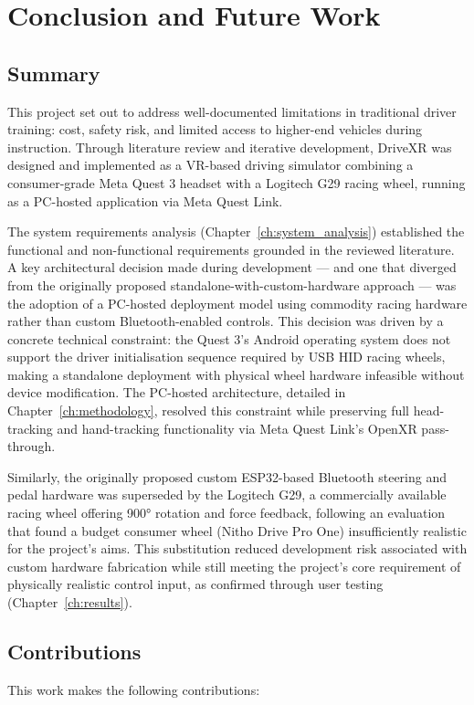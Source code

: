 \chapter{Conclusion and Future Work}
\label{ch:conclusion}

\section{Summary}
This project set out to address well-documented limitations in traditional driver training: cost, safety risk, and limited access to higher-end vehicles during instruction. Through literature review and iterative development, DriveXR was designed and implemented as a VR-based driving simulator combining a consumer-grade Meta Quest 3 headset with a Logitech G29 racing wheel, running as a PC-hosted application via Meta Quest Link.

The system requirements analysis (Chapter~\ref{ch:system_analysis}) established the functional and non-functional requirements grounded in the reviewed literature. A key architectural decision made during development — and one that diverged from the originally proposed standalone-with-custom-hardware approach — was the adoption of a PC-hosted deployment model using commodity racing hardware rather than custom Bluetooth-enabled controls. This decision was driven by a concrete technical constraint: the Quest 3's Android operating system does not support the driver initialisation sequence required by USB HID racing wheels, making a standalone deployment with physical wheel hardware infeasible without device modification. The PC-hosted architecture, detailed in Chapter~\ref{ch:methodology}, resolved this constraint while preserving full head-tracking and hand-tracking functionality via Meta Quest Link's OpenXR pass-through.

Similarly, the originally proposed custom ESP32-based Bluetooth steering and pedal hardware was superseded by the Logitech G29, a commercially available racing wheel offering 900° rotation and force feedback, following an evaluation that found a budget consumer wheel (Nitho Drive Pro One) insufficiently realistic for the project's aims. This substitution reduced development risk associated with custom hardware fabrication while still meeting the project's core requirement of physically realistic control input, as confirmed through user testing (Chapter~\ref{ch:results}).

\section{Contributions}
This work makes the following contributions:

